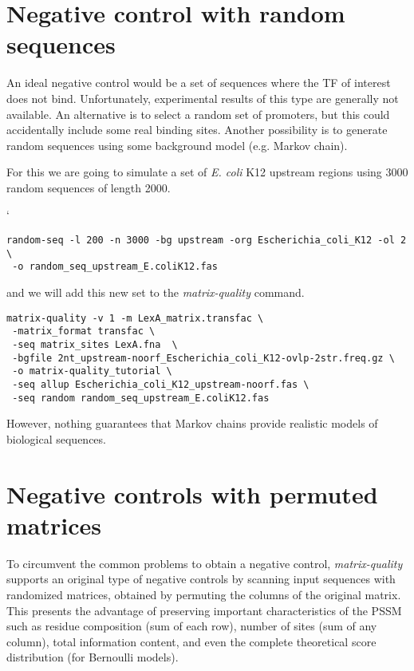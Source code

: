 \section{Negative control with random sequences}

An ideal negative control would be a set of sequences where the TF of
interest does not bind. Unfortunately, experimental results of this
type are generally not available. An alternative is to select a random
set of promoters, but this could accidentally include some real
binding sites. Another possibility is to generate random sequences
using some background model (e.g. Markov chain).

For this we are going to simulate a set of \textit{E. coli} K12
upstream regions using 3000 random sequences of length 2000.


{\color{Blue} `
\begin{footnotesize} 
\begin{verbatim}
random-seq -l 200 -n 3000 -bg upstream -org Escherichia_coli_K12 -ol 2 \
 -o random_seq_upstream_E.coliK12.fas
\end{verbatim} 
\end{footnotesize}
}

and we will add this new set to the \textit{matrix-quality} command.

{\color{Blue} 
\begin{footnotesize}
\begin{verbatim}
matrix-quality -v 1 -m LexA_matrix.transfac \
 -matrix_format transfac \
 -seq matrix_sites LexA.fna  \
 -bgfile 2nt_upstream-noorf_Escherichia_coli_K12-ovlp-2str.freq.gz \
 -o matrix-quality_tutorial \
 -seq allup Escherichia_coli_K12_upstream-noorf.fas \
 -seq random random_seq_upstream_E.coliK12.fas
\end{verbatim} 
\end{footnotesize} }

However, nothing guarantees that Markov chains provide realistic
models of biological sequences.

\section{Negative controls with permuted matrices}

To circumvent the common problems to obtain a negative
control,\textit{ matrix-quality} supports an original type of negative
controls by scanning input sequences with randomized matrices,
obtained by permuting the columns of the original matrix. This
presents the advantage of preserving important characteristics of the
PSSM such as residue composition (sum of each row), number of sites
(sum of any column), total information content, and even the complete
theoretical score distribution (for Bernoulli models).

